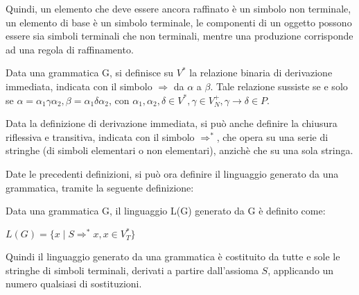   Quindi, un elemento che deve essere ancora raffinato è un simbolo non terminale, un elemento di base è un simbolo terminale, le componenti di un oggetto possono essere sia simboli terminali che non terminali, mentre una produzione corrisponde ad una regola di raffinamento.

  \begin{definition}
    Data una grammatica G, si definisce su \(V^*\) la relazione binaria di derivazione immediata, indicata con il simbolo \(\Rightarrow\) da \(\alpha\) a \(\beta\). Tale relazione sussiste se e solo se \(\alpha=\alpha_1\gamma\alpha_2, \beta=\alpha_1\delta\alpha_2\), con \(\alpha_1, \alpha_2, \delta \in V^*, \gamma \in V_N^+, \gamma\to\delta\in P\).
  \end{definition}

  Data la definizione di derivazione immediata, si può anche definire la chiusura riflessiva e transitiva, indicata con il simbolo \(\Rightarrow^*\), che opera su una serie di stringhe (di simboli elementari o non elementari), anzichè che su una sola stringa.
  
  \break
  
  Date le precedenti definizioni, si può ora definire il linguaggio generato da una grammatica, tramite la seguente definizione:
  \begin{definition}
    Data una grammatica G, il linguaggio L(G) generato da G è definito come:

    \(L(G)=\{x\;|\;S\Rightarrow^*x, x\in V_T^*\}\)
  \end{definition}

  Quindi il linguaggio generato da una grammatica è costituito da tutte e sole le stringhe di simboli terminali, derivati a partire dall'assioma \(S\), applicando un numero qualsiasi di sostituzioni.

